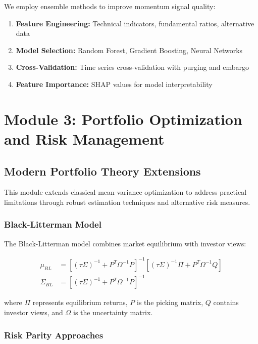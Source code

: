\documentclass[12pt,a4paper]{article}
\begin{document}
We employ ensemble methods to improve momentum signal quality:

\begin{enumerate}
    \item \textbf{Feature Engineering:} Technical indicators, fundamental ratios, alternative data
    \item \textbf{Model Selection:} Random Forest, Gradient Boosting, Neural Networks
    \item \textbf{Cross-Validation:} Time series cross-validation with purging and embargo
    \item \textbf{Feature Importance:} SHAP values for model interpretability
\end{enumerate}

\section{Module 3: Portfolio Optimization and Risk Management}

\subsection{Modern Portfolio Theory Extensions}

This module extends classical mean-variance optimization to address practical limitations through robust estimation techniques and alternative risk measures.

\subsubsection{Black-Litterman Model}

The Black-Litterman model combines market equilibrium with investor views:

\begin{align}
\mu_{BL} &= \left[(\tau\Sigma)^{-1} + P^T\Omega^{-1}P\right]^{-1}\left[(\tau\Sigma)^{-1}\Pi + P^T\Omega^{-1}Q\right] \\
\Sigma_{BL} &= \left[(\tau\Sigma)^{-1} + P^T\Omega^{-1}P\right]^{-1}
\end{align}

where $\Pi$ represents equilibrium returns, $P$ is the picking matrix, $Q$ contains investor views, and $\Omega$ is the uncertainty matrix.

\subsubsection{Risk Parity Approaches}
\end{document}
